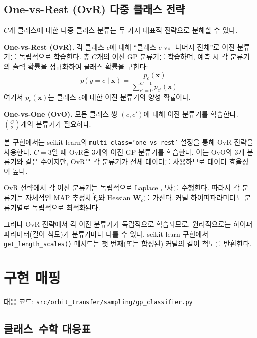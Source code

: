 \documentclass[11pt]{article}
\begin{document}
\subsection{One-vs-Rest (OvR) 다중 클래스 전략}

$C$개 클래스에 대한 다중 클래스 분류는 두 가지 대표적 전략으로 분해할 수 있다.

\textbf{One-vs-Rest (OvR).}
각 클래스 $c$에 대해 ``클래스 $c$ vs.\ 나머지 전체''로 이진 분류기를 독립적으로 학습한다.
총 $C$개의 이진 GP 분류기를 학습하며, 예측 시 각 분류기의 출력 확률을 정규화하여 클래스 확률을 구한다:
\begin{equation}
p(y = c \mid \mathbf{x}) = \frac{p_c(\mathbf{x})}{\sum_{c'=0}^{C-1} p_{c'}(\mathbf{x})}
\label{eq:ovr}
\end{equation}
여기서 $p_c(\mathbf{x})$는 클래스 $c$에 대한 이진 분류기의 양성 확률이다.

\textbf{One-vs-One (OvO).}
모든 클래스 쌍 $(c, c')$에 대해 이진 분류기를 학습한다. $\binom{C}{2}$개의 분류기가 필요하다.

본 구현에서는 scikit-learn의 \texttt{multi\_class='one\_vs\_rest'} 설정을 통해 OvR 전략을 사용한다.
$C = 3$일 때 OvR은 3개의 이진 GP 분류기를 학습한다.
이는 OvO의 3개 분류기와 같은 수이지만, OvR은 각 분류기가 전체 데이터를 사용하므로 데이터 효율성이 높다.

OvR 전략에서 각 이진 분류기는 독립적으로 Laplace 근사를 수행한다.
따라서 각 분류기는 자체적인 MAP 추정치 $\hat{\mathbf{f}}_c$와 Hessian $\mathbf{W}_c$를 가진다.
커널 하이퍼파라미터도 분류기별로 독립적으로 최적화된다.

그러나 OvR 전략에서 각 이진 분류기가 독립적으로 학습되므로,
원리적으로는 하이퍼파라미터(길이 척도)가 분류기마다 다를 수 있다.
scikit-learn 구현에서 \texttt{get\_length\_scales()} 메서드는 첫 번째(또는 합성된) 커널의 길이 척도를 반환한다.


\section{구현 매핑}

\noindent 대응 코드: \texttt{src/orbit\_transfer/sampling/gp\_classifier.py}

\subsection{클래스--수학 대응표}
\end{document}
